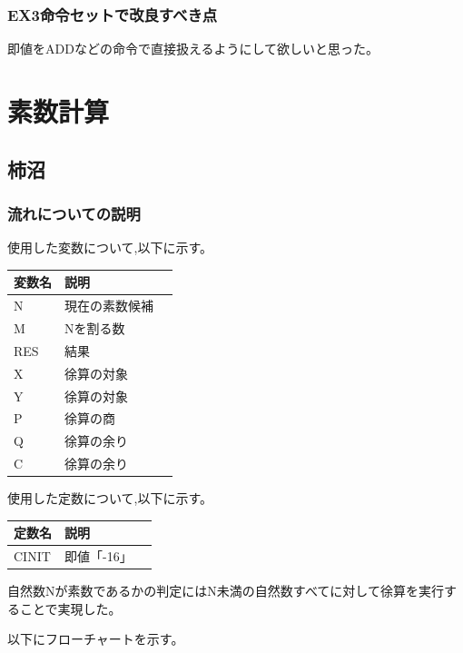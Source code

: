 \documentclass[dvipdfmx,12pt]{jreport}
\begin{document}
\subsubsection{EX3命令セットで改良すべき点}
即値をADDなどの命令で直接扱えるようにして欲しいと思った。

\section*{素数計算}
\subsection*{柿沼}
\subsubsection*{流れについての説明}
使用した変数について,以下に示す。
\begin{table}[h]
  \begin{tabular}{|l|l|l|} \hline
    変数名 & 説明 \\ \hline
    N & 現在の素数候補 \\ \hline
    M & Nを割る数 \\ \hline
    RES & 結果 \\ \hline
    X & 徐算の対象 \\ \hline
    Y & 徐算の対象 \\ \hline
    P & 徐算の商 \\ \hline
    Q & 徐算の余り \\ \hline
    C & 徐算の余り \\ \hline
  \end{tabular}
\end{table}
使用した定数について,以下に示す。
\begin{table}[h]
  \begin{tabular}{|l|l|l|} \hline
    定数名 & 説明 \\ \hline
    CINIT & 即値「-16」 \\ \hline
  \end{tabular}
\end{table}

自然数Nが素数であるかの判定にはN未満の自然数すべてに対して徐算を実行することで実現した。

以下にフローチャートを示す。 \\
\end{document}
